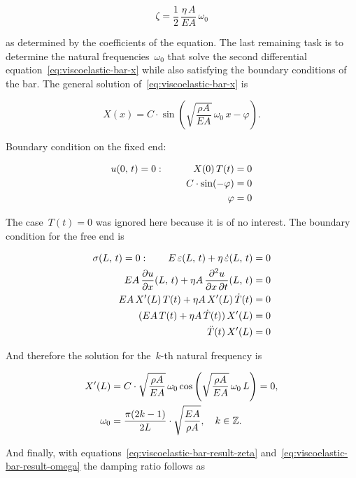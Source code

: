 \begin{equation}
\zeta = \frac{1}{2}\,\frac{\eta\,A}{EA}\,\omega_0\label{eq:viscoelastic-bar-result-zeta}
\end{equation}

as determined by the coefficients of the equation. The last remaining task is to determine the natural frequencies~$\omega_0$ that solve the second differential equation~\eqref{eq:viscoelastic-bar-x} while also satisfying the boundary conditions of the bar. The general solution of~\eqref{eq:viscoelastic-bar-x} is

\begin{equation}
X(x) = C\cdot\sin\left(\sqrt{\frac{\rho A}{EA}}\,\omega_0\,x - \varphi\right).
\end{equation}

Boundary condition on the fixed end:

\begin{align}
u(0,\,t) = 0: \quad\quad\quad X(0)\,T(t) &= 0 \notag \\
C\cdot\sin(-\varphi) &= 0 \notag \\
\varphi &= 0
\end{align}

The case~$T(t) = 0$ was ignored here because it is of no interest. The boundary condition for the free end is

\begin{align}
\sigma(L,\,t) = 0: \quad\quad E\,\varepsilon(L,\,t) + \eta\,\dot{\varepsilon}(L,\,t) &= 0 \notag \\
EA\,\frac{\partial u}{\partial x}(L,\,t) + \eta A\,\frac{\partial^2 u}{\partial x\,\partial t}(L,\,t) &= 0 \notag \\
EA\,X'(L)\,T(t) + \eta A\,X'(L)\,\dot{T}(t) &= 0 \notag \\
(EA\,T(t) + \eta A\,\dot{T}(t))\,X'(L) &= 0 \notag \\
\ddot{T}(t)\,X'(L) &= 0 \notag
\end{align}

And therefore the solution for the~$k$-th natural frequency is

\begin{align}
X'(L) &= C\cdot\sqrt{\frac{\rho A}{EA}}\,\omega_0\cos\left(\sqrt{\frac{\rho A}{EA}}\,\omega_0\,L\right) = 0, \notag \\
\omega_0 &= \frac{\pi(2k - 1)}{2L}\cdot\sqrt{\frac{EA}{\rho A}},\quad k \in \mathbb{Z}.\label{eq:viscoelastic-bar-result-omega}
\end{align}

And finally, with equations~\eqref{eq:viscoelastic-bar-result-zeta} and~\eqref{eq:viscoelastic-bar-result-omega} the damping ratio follows as

